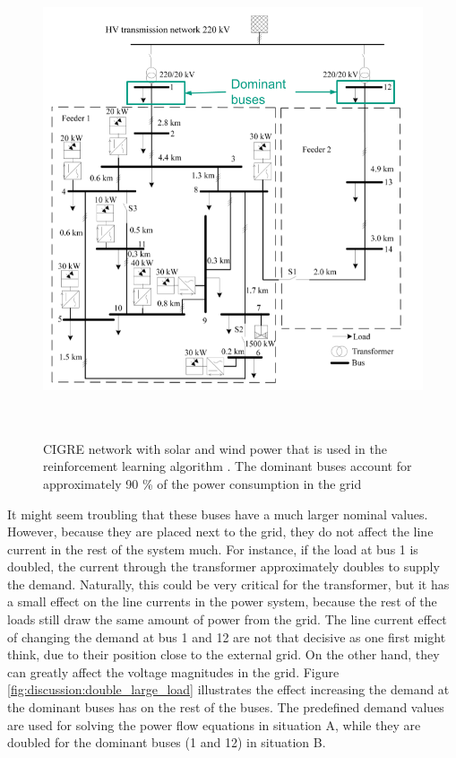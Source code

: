 \documentclass[class=book, crop=false]{standalone}
\begin{document}
\begin{figure}[ht!]
    \center
    \includegraphics[height=14cm, width=13.5cm]{figures/cigre_network_dominant.png}
    \caption[size = 9]{CIGRE network with solar and wind power that is used in the reinforcement learning algorithm \cite{cigre}. The dominant buses account for approximately 90 \% of the power consumption in the grid}
    \label{fig:discussion:cigre_network_dominant}
\end{figure}
It might seem troubling that these buses have a much larger nominal values. However, because they are placed next to the grid, they do not affect the line current in the rest of the system much. For instance, if the load at bus 1 is doubled, the current through the transformer approximately doubles to supply the demand. Naturally, this could be very critical for the transformer, but it has a small effect on the line currents in the power system, because the rest of the loads still draw the same amount of power from the grid. The line current effect of changing the demand at bus 1 and 12 are not that decisive as one first might think, due to their position close to the external grid. On the other hand, they can greatly affect the voltage magnitudes in the grid. Figure \ref{fig:discussion:double_large_load} illustrates the effect increasing the demand at the dominant buses has on the rest of the buses. The predefined demand values are used for solving the power flow equations in situation A, while they are doubled for the dominant buses (1 and 12) in situation B.
\end{document}
